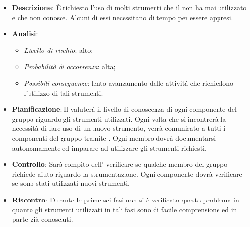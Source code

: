 			\begin{itemize}
				\item \textbf{Descrizione}: È richiesto l'uso di molti strumenti  che il  non ha mai utilizzato e che non conosce. Alcuni di essi necessitano di tempo per essere appresi.
				\item \textbf{Analisi}:
				\begin{itemize}
					\item \textit{Livello di rischio}: alto;
					\item \textit{Probabilità di occorrenza}: alta;
					\item \textit{Possibili conseguenze}: lento avanzamento delle attività che richiedono l'utilizzo di tali strumenti.
				\end{itemize}
				\item \textbf{Pianificazione}: Il  valuterà il livello di conoscenza di ogni componente del gruppo riguardo gli strumenti utilizzati. Ogni volta che si incontrerà la necessità di fare uso di un nuovo strumento, verrà comunicato a tutti i componenti del gruppo tramite . Ogni membro dovrà documentarsi autonomamente ed imparare ad utilizzare gli strumenti richiesti.
				\item \textbf{Controllo}: Sarà compito dell' verificare se qualche membro del gruppo richiede aiuto riguardo la strumentazione. Ogni componente dovrà verificare se sono stati utilizzati nuovi strumenti.
				\item \textbf{Riscontro}: Durante le prime sei fasi non si è verificato questo problema in quanto gli strumenti utilizzati in tali fasi sono di facile comprensione ed in parte già conosciuti.
			\end{itemize}
